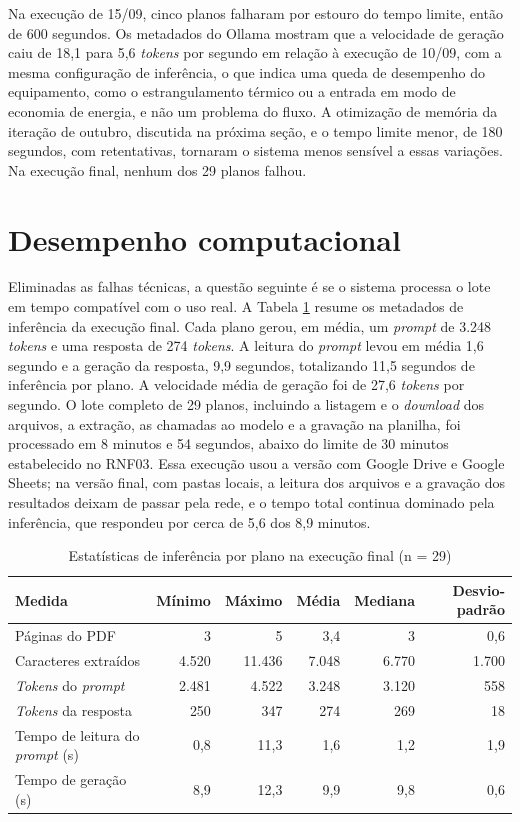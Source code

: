 Na execução de 15/09, cinco planos falharam por estouro do tempo limite, então de 600 segundos. Os metadados do Ollama mostram que a velocidade de geração caiu de 18,1 para 5,6 \textit{tokens} por segundo em relação à execução de 10/09, com a mesma configuração de inferência, o que indica uma queda de desempenho do equipamento, como o estrangulamento térmico ou a entrada em modo de economia de energia, e não um problema do fluxo. A otimização de memória da iteração de outubro, discutida na próxima seção, e o tempo limite menor, de 180 segundos, com retentativas, tornaram o sistema menos sensível a essas variações. Na execução final, nenhum dos 29 planos falhou.

\section{Desempenho computacional}
\label{sec:res-desempenho}

Eliminadas as falhas técnicas, a questão seguinte é se o sistema processa o lote em tempo compatível com o uso real. A Tabela \ref{tab:desempenho} resume os metadados de inferência da execução final. Cada plano gerou, em média, um \textit{prompt} de 3.248 \textit{tokens} e uma resposta de 274 \textit{tokens}. A leitura do \textit{prompt} levou em média 1,6 segundo e a geração da resposta, 9,9 segundos, totalizando 11,5 segundos de inferência por plano. A velocidade média de geração foi de 27,6 \textit{tokens} por segundo. O lote completo de 29 planos, incluindo a listagem e o \textit{download} dos arquivos, a extração, as chamadas ao modelo e a gravação na planilha, foi processado em 8 minutos e 54 segundos, abaixo do limite de 30 minutos estabelecido no RNF03. Essa execução usou a versão com Google Drive e Google Sheets; na versão final, com pastas locais, a leitura dos arquivos e a gravação dos resultados deixam de passar pela rede, e o tempo total continua dominado pela inferência, que respondeu por cerca de 5,6 dos 8,9 minutos.

\begin{table}[H]
\centering
\caption{Estatísticas de inferência por plano na execução final (n = 29)}
\label{tab:desempenho}
\footnotesize
\begin{tabular}{@{}lrrrrr@{}}
\toprule
\rowcolor[HTML]{EFEFEF}
\textbf{Medida} & \textbf{Mínimo} & \textbf{Máximo} & \textbf{Média} & \textbf{Mediana} & \textbf{Desvio-padrão} \\ \midrule
Páginas do PDF & 3 & 5 & 3,4 & 3 & 0,6 \\
Caracteres extraídos & 4.520 & 11.436 & 7.048 & 6.770 & 1.700 \\
\textit{Tokens} do \textit{prompt} & 2.481 & 4.522 & 3.248 & 3.120 & 558 \\
\textit{Tokens} da resposta & 250 & 347 & 274 & 269 & 18 \\
Tempo de leitura do \textit{prompt} (s) & 0,8 & 11,3 & 1,6 & 1,2 & 1,9 \\
Tempo de geração (s) & 8,9 & 12,3 & 9,9 & 9,8 & 0,6 \\ \bottomrule
\end{tabular}
\end{table}

